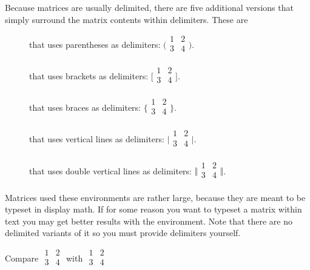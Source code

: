 Because matrices are usually delimited, there are five additional versions that
simply surround the matrix contents within delimiters. These are
\begin{description}
  \item[] that uses parentheses as delimiters:
    \(\bigl(
    \begin{smallmatrix}
      1 & 2 \\
      3 & 4 \\
    \end{smallmatrix}
    \bigr)\).
  \item[] that uses brackets as delimiters:
    \(\bigl[
      \begin{smallmatrix}
        1 & 2 \\
        3 & 4 \\
      \end{smallmatrix}
      \bigr]\).
  \item[] that uses braces as delimiters:
    \(\bigl\{
    \begin{smallmatrix}
      1 & 2 \\
      3 & 4 \\
    \end{smallmatrix}
    \bigr\}\).
  \item[] that uses vertical lines as delimiters:
    \(\bigl\vert
    \begin{smallmatrix}
      1 & 2 \\
      3 & 4 \\
    \end{smallmatrix}
    \bigr\vert\).
  \item[] that uses double vertical lines as delimiters:
    \(\bigl\Vert
    \begin{smallmatrix}
      1 & 2 \\
      3 & 4 \\
    \end{smallmatrix}
    \bigr\Vert\).
\end{description}

Matrices used these environments are rather large, because they are meant to be
typeset in display math. If for some reason you want to typeset a matrix within
text you may get better results with the  environment. Note
that there are no delimited variants of it so you must provide delimiters
yourself.
\begin{example}
Compare \(
  \begin{matrix}
    1 & 2 \\
    3 & 4 \\
  \end{matrix}
\) with \(
  \begin{smallmatrix}
    1 & 2 \\
    3 & 4 \\
  \end{smallmatrix}
\)
\end{example}


